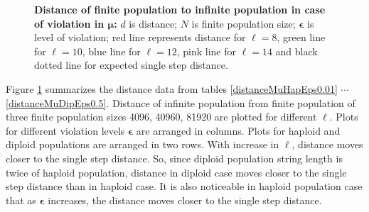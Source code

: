 \begin{figure}[h]
\begin{center}
\hspace{-3em}%
\caption[\textbf{Distance of finite population to infinite population in case of violation in $\bm{\mu}$}]{\textbf{Distance of finite population to infinite population in case of violation in $\bm{\mu}$:}  
  $d$ is distance; $N$ is finite population size; $\bm{\epsilon}$ is level of violation;
  red line represents distance for $\ell = 8$, green line for $\ell = 10$, blue line for $\ell = 12$, pink line for $\ell = 14$ 
  and black dotted line for expected single step distance.}
\label{vio_mu_dist}
\end{center}
\end{figure}
Figure \ref{vio_mu_dist} summarizes the distance data from tables \ref{distanceMuHapEps0.01} $\cdots$ 
\ref{distanceMuDipEps0.5}. Distance of infinite population from finite population of 
three finite population sizes {4096, 40960, 81920} are plotted for different $\ell$. 
Plots for different violation levels $\bm{\epsilon}$ are arranged in columns. 
Plots for haploid and diploid populations are arranged in two rows. With increase in $\ell$, 
distance moves closer to the single step distance. So, since diploid population 
string length is twice of haploid population, 
distance in diploid case moves closer to the single step distance than in haploid case. 
It is also noticeable in haploid population case that as $\bm{\epsilon}$ increases, 
the distance moves closer to the single step distance.

\clearpage
